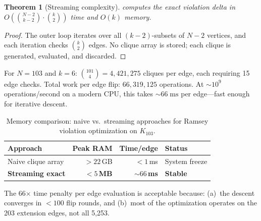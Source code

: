 \documentclass[11pt,a4paper]{article}
\theoremstyle{plain}
\newtheorem{theorem}{Theorem}[section]
\theoremstyle{remark}
\begin{document}
\begin{theorem}[Streaming complexity]\label{thm:streaming}
 computes the exact violation delta in
$O\!\left(\binom{N-2}{k-2} \cdot \binom{k}{2}\right)$ time and
$O(k)$ memory.
\end{theorem}

\begin{proof}
The outer loop iterates over all $(k-2)$-subsets of
$N - 2$ vertices, and each iteration checks $\binom{k}{2}$ edges.
No clique array is stored; each clique is generated, evaluated, and
discarded.
\end{proof}

For $N = 103$ and $k = 6$: $\binom{101}{4} = 4{,}421{,}275$ cliques
per edge, each requiring 15 edge checks.
Total work per edge flip: $66{,}319{,}125$ operations.
At ${\sim}10^9$ operations/second on a modern CPU, this takes
${\sim}66\;\text{ms}$ per edge---fast enough for iterative descent.

\begin{table}[H]
\centering
\caption{Memory comparison: naive vs.\ streaming approaches for
  Ramsey violation optimization on $K_{103}$.}
\label{tab:memory}
\small
\begin{tabular}{@{}lrrl@{}}
\toprule
\textbf{Approach} & \textbf{Peak RAM} & \textbf{Time/edge} & \textbf{Status} \\
\midrule
Naive clique array & $> 22$\,GB & $< 1$\,ms & System freeze \\
\textbf{Streaming exact} & \textbf{$< 5$\,MB} & \textbf{${\sim}66$\,ms} & \textbf{Stable} \\
\bottomrule
\end{tabular}
\end{table}

The 66$\times$ time penalty per edge evaluation is acceptable because:
(a)~the descent converges in $< 100$ flip rounds, and
(b)~most of the optimization operates on the 203 extension edges, not
all 5{,}253.
\end{document}
